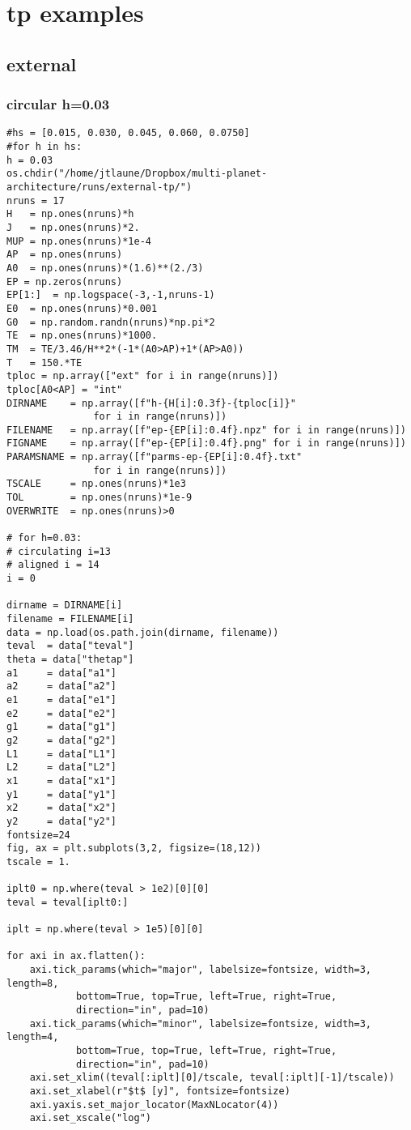 \documentclass[11pt]{article}
\begin{document}
\section{tp examples}
\label{sec:org16670a5}
\subsection{external}
\label{sec:org713e05d}
\subsubsection{circular h=0.03}
\label{sec:org80c9cd2}
\begin{verbatim}
#hs = [0.015, 0.030, 0.045, 0.060, 0.0750]
#for h in hs:
h = 0.03
os.chdir("/home/jtlaune/Dropbox/multi-planet-architecture/runs/external-tp/")
nruns = 17
H   = np.ones(nruns)*h
J   = np.ones(nruns)*2.
MUP = np.ones(nruns)*1e-4
AP  = np.ones(nruns)
A0  = np.ones(nruns)*(1.6)**(2./3)
EP = np.zeros(nruns)
EP[1:]  = np.logspace(-3,-1,nruns-1)
E0  = np.ones(nruns)*0.001
G0  = np.random.randn(nruns)*np.pi*2
TE  = np.ones(nruns)*1000.
TM  = TE/3.46/H**2*(-1*(A0>AP)+1*(AP>A0))
T   = 150.*TE
tploc = np.array(["ext" for i in range(nruns)])
tploc[A0<AP] = "int"
DIRNAME    = np.array([f"h-{H[i]:0.3f}-{tploc[i]}"
		       for i in range(nruns)])
FILENAME   = np.array([f"ep-{EP[i]:0.4f}.npz" for i in range(nruns)])
FIGNAME    = np.array([f"ep-{EP[i]:0.4f}.png" for i in range(nruns)])
PARAMSNAME = np.array([f"parms-ep-{EP[i]:0.4f}.txt"
		       for i in range(nruns)])
TSCALE     = np.ones(nruns)*1e3
TOL        = np.ones(nruns)*1e-9
OVERWRITE  = np.ones(nruns)>0

# for h=0.03:
# circulating i=13
# aligned i = 14
i = 0

dirname = DIRNAME[i]
filename = FILENAME[i]
data = np.load(os.path.join(dirname, filename))
teval  = data["teval"]
theta = data["thetap"]
a1     = data["a1"]
a2     = data["a2"]
e1     = data["e1"]
e2     = data["e2"]
g1     = data["g1"]
g2     = data["g2"]
L1     = data["L1"]
L2     = data["L2"]
x1     = data["x1"]
y1     = data["y1"]
x2     = data["x2"]
y2     = data["y2"]
fontsize=24
fig, ax = plt.subplots(3,2, figsize=(18,12))
tscale = 1.

iplt0 = np.where(teval > 1e2)[0][0]
teval = teval[iplt0:]

iplt = np.where(teval > 1e5)[0][0]

for axi in ax.flatten():
    axi.tick_params(which="major", labelsize=fontsize, width=3, length=8,
		    bottom=True, top=True, left=True, right=True,
		    direction="in", pad=10)
    axi.tick_params(which="minor", labelsize=fontsize, width=3, length=4,
		    bottom=True, top=True, left=True, right=True,
		    direction="in", pad=10)
    axi.set_xlim((teval[:iplt][0]/tscale, teval[:iplt][-1]/tscale))
    axi.set_xlabel(r"$t$ [y]", fontsize=fontsize)
    axi.yaxis.set_major_locator(MaxNLocator(4))
    axi.set_xscale("log")


\end{verbatim}
\end{document}
